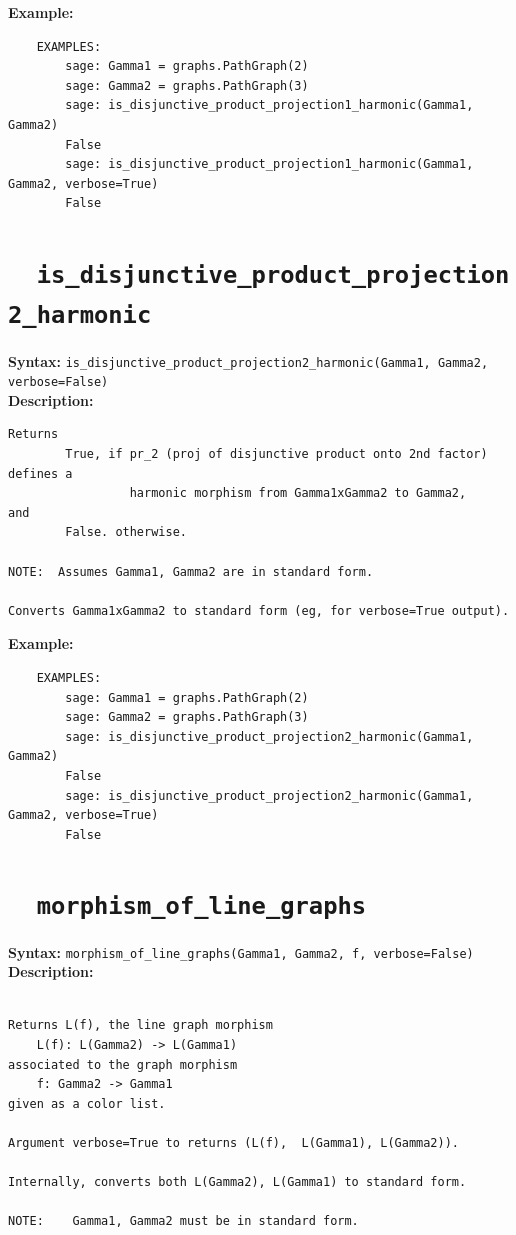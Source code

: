 \documentclass{article}
\begin{document}
\textbf{Example:}
\begin{verbatim}
    EXAMPLES:
        sage: Gamma1 = graphs.PathGraph(2)
        sage: Gamma2 = graphs.PathGraph(3)
        sage: is_disjunctive_product_projection1_harmonic(Gamma1, Gamma2) 
        False
        sage: is_disjunctive_product_projection1_harmonic(Gamma1, Gamma2, verbose=True) 
        False
\end{verbatim}

\section{\tt \ \ is\_disjunctive\_product\_projection2\_harmonic}

\textbf{Syntax:} \verb}is_disjunctive_product_projection2_harmonic(Gamma1, Gamma2, verbose=False)}\\

\textbf{Description:}
\begin{verbatim}
Returns
        True, if pr_2 (proj of disjunctive product onto 2nd factor) defines a 
                 harmonic morphism from Gamma1xGamma2 to Gamma2,
and
        False. otherwise. 

NOTE:  Assumes Gamma1, Gamma2 are in standard form.

Converts Gamma1xGamma2 to standard form (eg, for verbose=True output).
\end{verbatim}

\textbf{Example:}
\begin{verbatim}
    EXAMPLES:
        sage: Gamma1 = graphs.PathGraph(2)
        sage: Gamma2 = graphs.PathGraph(3)
        sage: is_disjunctive_product_projection2_harmonic(Gamma1, Gamma2) 
        False
        sage: is_disjunctive_product_projection2_harmonic(Gamma1, Gamma2, verbose=True) 
        False
\end{verbatim}

\section{\tt \ \ morphism\_of\_line\_graphs}

\textbf{Syntax:} \verb}morphism_of_line_graphs(Gamma1, Gamma2, f, verbose=False)}\\

\textbf{Description:}
\begin{verbatim}

Returns L(f), the line graph morphism
    L(f): L(Gamma2) -> L(Gamma1) 
associated to the graph morphism 
    f: Gamma2 -> Gamma1
given as a color list.

Argument verbose=True to returns (L(f),  L(Gamma1), L(Gamma2)).

Internally, converts both L(Gamma2), L(Gamma1) to standard form. 

NOTE:    Gamma1, Gamma2 must be in standard form.
\end{verbatim}
\end{document}
